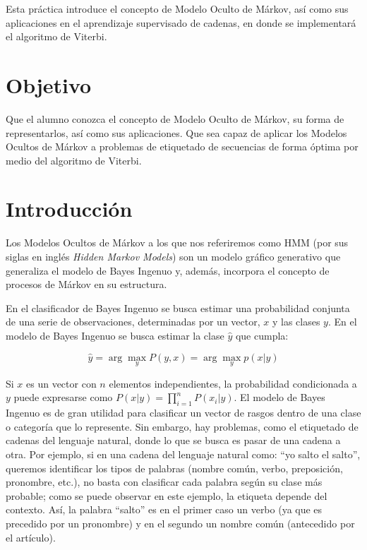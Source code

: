 
Esta práctica introduce el concepto de Modelo Oculto de Márkov, así como sus aplicaciones en el aprendizaje supervisado de cadenas, en donde se implementará el algoritmo de Viterbi.

\section{Objetivo}

Que el alumno conozca el concepto de Modelo Oculto de Márkov, su forma de representarlos, así como sus aplicaciones. Que sea capaz de aplicar los Modelos Ocultos de Márkov a problemas de etiquetado de secuencias de forma óptima por medio del algoritmo de Viterbi.


\section{Introducción}

Los Modelos Ocultos de Márkov a los que nos referiremos como HMM (por sus siglas en inglés \emph{Hidden Markov Models}) son un modelo gráfico generativo que generaliza el modelo de Bayes Ingenuo y, además, incorpora el concepto de procesos de Márkov en su estructura.

En el clasificador de Bayes Ingenuo se busca estimar una probabilidad conjunta de una serie de observaciones, determinadas por un vector, $x$ y las clases $y$. En el modelo de Bayes Ingenuo se busca estimar la clase $\hat{y}$ que cumpla:

$$ \hat{y} = \arg\max_y P(y,x) = \arg\max_y p(x|y)$$

Si $x$ es un vector con $n$ elementos independientes, la probabilidad condicionada a $y$ puede expresarse como $P(x|y) = \prod_{i=1}^n P(x_i | y)$. El modelo de Bayes Ingenuo es de gran utilidad para clasificar un vector de rasgos dentro de una clase o categoría que lo represente. Sin embargo, hay problemas, como el etiquetado de cadenas del lenguaje natural, donde lo que se busca es pasar de una cadena a otra. Por ejemplo, si en una cadena del lenguaje natural como: ``yo salto el salto'', queremos identificar los tipos de palabras (nombre común, verbo, preposición, pronombre, etc.), no basta con clasificar cada palabra según su clase más probable; como se puede observar en este ejemplo, la etiqueta depende del contexto. Así, la palabra ``salto'' es en el primer caso un verbo (ya que es precedido por un pronombre) y en el segundo un nombre común (antecedido por el artículo).

